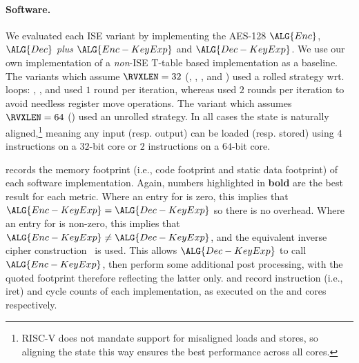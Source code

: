 \paragraph{Software.}
\label{sec:ise:eval:sw}

We evaluated each ISE variant by implementing the AES-128
$\ALG{Enc}$,
$\ALG{Dec}$
{\em plus}
$\ALG{Enc-KeyExp}$
and
$\ALG{Dec-KeyExp}$.
We use our own implementation of a {\em non}-ISE 
T-table based
implementation as a baseline.
The variants which assume  $\RVXLEN = 32$
(, ,     , and )
used a    rolled strategy wrt. loops:
 , ,              and 
used  $1$ round  per iteration,
whereas
used $2$ rounds per iteration
to avoid needless register move operations.
The variant  which assumes $\RVXLEN = 64$
()
used an unrolled strategy.
In all cases the state is naturally aligned,\footnote{%
RISC-V does not mandate support for misaligned loads and stores, so
aligning the state this way ensures the best performance across all
cores.
} meaning any input (resp. output) can be loaded (resp. stored) 
using 
$4$  instructions on a $32$-bit core
or
$2$  instructions on a $64$-bit core.

records the
memory footprint (i.e., code footprint and static data footprint)
of each software implementation.
Again, numbers highlighted in {\bf bold} are the best result for each metric.
Where an entry for
is     zero, this implies that
$\ALG{Enc-KeyExp} =    \ALG{Dec-KeyExp}$
so there is no overhead.
Where an entry for
is non-zero, this implies that
$\ALG{Enc-KeyExp} \neq \ALG{Dec-KeyExp}$,
and the equivalent inverse cipher construction~\cite[Section 5.3.5]{FIPS:197}
is used.
This allows $\ALG{Dec-KeyExp}$ to
call $\ALG{Enc-KeyExp}$,
then
perform some additional post processing,
with the quoted footprint therefore reflecting the latter only.  
and
record
instruction (i.e., iret) and cycle counts
of each implementation,
as executed on the  and  cores respectively.


